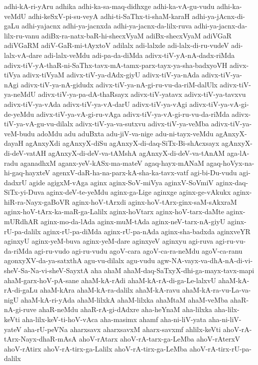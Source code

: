 {adhi-kA-ri-yAru
adhika
adhi-ka-sa-maq-didhxge
adhi-ka-vA-gu-vudu
adhi-ka-veMdU
adhi-keSxV-pi-su-veyA
adhi-ti-SaThx-ti-shaM-karaH
adhi-ya-jAcnx-di-gaLu
adhi-yajacnx
adhi-ya-jacnxda
adhi-ya-jacnx-da-lilx-ruva
adhi-ya-jacnx-da-lilx-ru-vanu
adiBx-ra-natx-baR-hi-shecxVyaM
adiBx-shecxVyaM
adiVGaR
adiVGaRM
adiV-GaR-mi-tAyxtoV
adilalx
adi-lalxde
adi-lalx-di-ru-vudeV
adi-lalx-vA-dare
adi-lalx-veMdu
adi-pa-da-diMda
adivx-tiV-yA-nA-dadx-riMda
adivx-tiV-yA-thaR-ni-SaThx-tavx-mA-tamx-parx-tayx-ya-sha-badxyoVH
adivx-tiVya
adivx-tiVyaM
adivx-tiV-ya-dAdx-giyU
adivx-tiV-ya-nAda
adivx-tiV-ya-nAgi
adivx-tiV-ya-nA-gidudx
adivx-tiV-ya-nA-gi-ru-vu-da-riM-dalUlx
adivx-tiV-ya-neMdU
adivx-tiV-ya-pa-dA-thaRsayx
adivx-tiV-yatavx
adivx-tiV-ya-tavxvu
adivx-tiV-ya-vAda
adivx-tiV-ya-vA-darU
adivx-tiV-ya-vAgi
adivx-tiV-ya-vA-gi-de-yeMdu
adivx-tiV-ya-vA-gi-ru-vAga
adivx-tiV-ya-vA-gi-ru-vu-da-riMda
adivx-tiV-ya-vA-gu-vu-dilalx
adivx-tiV-ya-va-sutxvu
adivx-tiV-ya-veMba
adivx-tiV-ya-veM-budu
adoMdu
adu
aduBxta
adu-jiV-va-nige
adu-ni-tayx-veMdu
agAnxyX-dayaH
agAnxyXdi
agAnxyX-diSu
agAnxyX-di-daq-SiTx-Bi-shAcxsayx
agAnxyX-di-deV-vatAH
agAnxyX-di-deV-va-tAMshA
agAnxyX-di-deV-va-tAnAM
aga-lA-radu
aganadhxM
aganx-yeV-kASx-ma-mateV
agaq-hayx-mANaM
agaq-hoVyx-na-hi-gaq-hayxteV
agenxV-daR-ha-na-parx-kA-sha-ka-tavx-vatf
agi-bi-Du-vudu
agi-dadxrU
agide
agigxM-vAga
aginx
aginx-SoV-miVya
aginxV-SoVmiV
aginx-daq-SiTx-yi-Duva
aginx-deV-te-yeMdu
aginx-ga-Lige
aginxge
aginx-ge-vAkukx
aginx-hiR-ra-Nayx-gaBoVR
aginx-hoV-tArxdi
aginx-hoV-tArx-ginx-saM-sAkxraM
aginx-hoV-tArx-ka-maR-ga-Lalilx
aginx-hoVtarx
aginx-hoV-tarx-daMte
aginx-mURdhAR
aginx-mo-da-lAda
aginx-muM-tAda
aginx-neV-tarx-nA-giyU
aginx-rU-pa-dalilx
aginx-rU-pa-diMda
aginx-rU-pa-nAda
aginx-sha-badxda
aginxveYR
aginxyU
aginx-yeM-buva
aginx-yeM-dare
aginxyeV
aginxyu
agi-ruva
agi-ru-vu-da-riMda
agi-ru-vudo
agi-ru-vudu
agoV-cara
agoV-ca-ra-neMdu
agoV-ca-ranu
agonxyXV-da-ya-satxthA
agu-vu-dilalx
agu-vudu
agw-NA-vayx-va-dhA-nA-di-vi-sheV-Sa-Na-vi-sheV-SayxtA
aha
ahaM
ahaM-daq-SaTxyX-dhi-ga-mayx-tavx-mapi
ahaM-garx-hoV-pA-sane
ahaM-kA-rAdi
ahaM-kA-rA-di-ga-Le-lalxvU
ahaM-kA-rA-di-gaLu
ahaM-kAra
ahaM-kA-ra-dalilx
ahaM-kA-ravu
ahaM-kA-ra-vu-La-va-nigU
ahaM-kA-ri-yAda
ahaM-lilxkA
ahaM-lilxka
ahaMtaM
ahaM-veMba
ahaR-nA-gi-ruve
ahaR-neMdu
ahaR-rA-gi-dAdxre
aha-heYnaM
aha-lilxka
aha-lilx-keVti
aha-lilx-keV-ti-hoV-vAca
aha-masimx
ahamf
aha-ni-liV-yata
aha-ni-liV-yateV
aha-rU-peVNa
aharxsavx
aharxsavxM
aharx-savxmf
ahlilx-keVti
ahoV-rA-tArx-Nayx-dhaR-mAsA
ahoV-rAtarx
ahoV-rA-tarx-ga-LeMba
ahoV-rAterxV
ahoV-rAtirx
ahoV-rA-tirx-ga-Lalilx
ahoV-rA-tirx-ga-LeMba
ahoV-rA-tirx-rU-pa-dalilx
}
